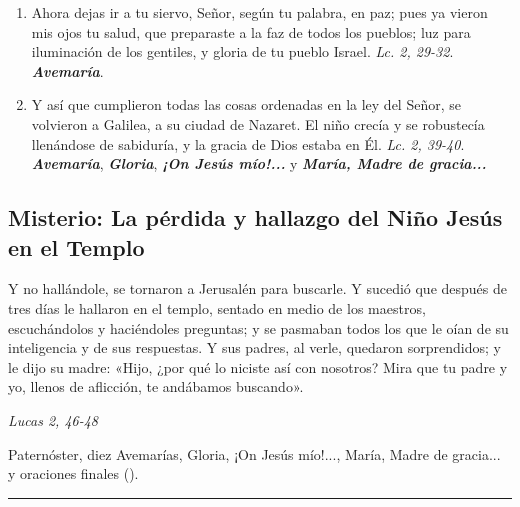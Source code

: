 \documentclass[./rosary.tex]{subfiles}
\newcounter{joyful-counter}
\begin{document}
\begin{enumerate}
      \item Ahora dejas ir a tu siervo, Señor, según tu palabra, en paz; pues ya vieron mis ojos tu salud, que preparaste a la faz de todos los pueblos;
            luz para iluminación de los gentiles, y gloria de tu pueblo Israel. \emph{Lc. 2, 29-32}. \textbf{\emph{Avemaría}}.

      \item Y así que cumplieron todas las cosas ordenadas en la ley del Señor, se volvieron a Galilea, a su ciudad de Nazaret.
            El niño crecía y se robustecía llenándose de sabiduría, y la gracia de Dios estaba en Él. \emph{Lc. 2, 39-40}.
            \textbf{\emph{Avemaría}}, \textbf{\emph{Gloria}}, \textbf{\emph{¡On Jesús mío!...}} y \textbf{\emph{María, Madre de gracia...}}
\end{enumerate}

\bigskip

\subsection*{ Misterio: La pérdida y hallazgo del Niño Jesús en el Templo}

Y no hallándole, se tornaron a Jerusalén para buscarle. Y sucedió que después de tres días le hallaron en el templo,
sentado en medio de los maestros, escuchándolos y haciéndoles preguntas; y se pasmaban todos los que le oían de su
inteligencia y de sus respuestas. Y sus padres, al verle, quedaron sorprendidos; y le dijo su madre:
«Hijo, ¿por qué lo niciste así con nosotros? Mira que tu padre y yo, llenos de aflicción, te andábamos buscando».
\begin{flushright}
      \emph{Lucas 2, 46-48}
\end{flushright}

Paternóster, diez Avemarías, Gloria, ¡On Jesús mío!..., María, Madre de gracia... y oraciones finales ().

\rule{\textwidth}{0.5pt}
\end{document}
